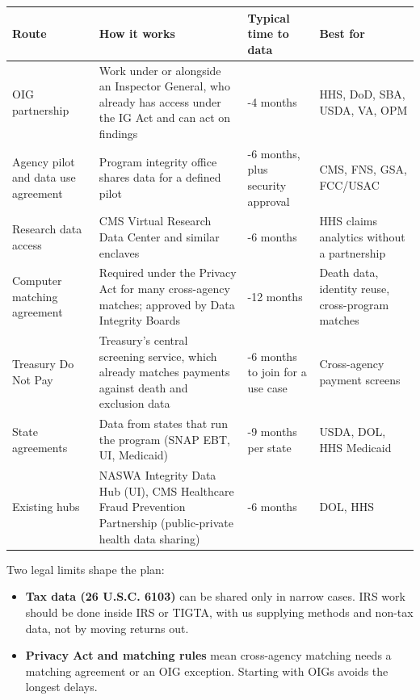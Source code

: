 \documentclass[letterpaper,11pt]{article}
\providecommand{\tightlist}{\setlength{\itemsep}{0pt}\setlength{\parskip}{0pt}}
\begin{document}
\begingroup\small\setlength{\tabcolsep}{4pt}\renewcommand{\arraystretch}{1.25}
\begin{longtable}[l]{@{}>{\raggedright\arraybackslash}p{}>{\raggedright\arraybackslash}p{}>{\raggedright\arraybackslash}p{}>{\raggedright\arraybackslash}p{}@{}}
\rowcolor{coolblack}\leavevmode\color{white}\bfseries Route & \leavevmode\color{white}\bfseries How it works & \leavevmode\color{white}\bfseries Typical time to data & \leavevmode\color{white}\bfseries Best for \\
\endhead
OIG partnership & Work under or alongside an Inspector General, who already has access under the IG Act and can act on findings & 2-4 months & HHS, DoD, SBA, USDA, VA, OPM \\
Agency pilot and data use agreement & Program integrity office shares data for a defined pilot & 3-6 months, plus security approval & CMS, FNS, GSA, FCC/USAC \\
Research data access & CMS Virtual Research Data Center and similar enclaves & 3-6 months & HHS claims analytics without a partnership \\
Computer matching agreement & Required under the Privacy Act for many cross-agency matches; approved by Data Integrity Boards & 6-12 months & Death data, identity reuse, cross-program matches \\
Treasury Do Not Pay & Treasury's central screening service, which already matches payments against death and exclusion data & 3-6 months to join for a use case & Cross-agency payment screens \\
State agreements & Data from states that run the program (SNAP EBT, UI, Medicaid) & 3-9 months per state & USDA, DOL, HHS Medicaid \\
Existing hubs & NASWA Integrity Data Hub (UI), CMS Healthcare Fraud Prevention Partnership (public-private health data sharing) & 2-6 months & DOL, HHS \\
\end{longtable}\endgroup

Two legal limits shape the plan:

\begin{itemize}
\tightlist
\item
  \textbf{Tax data (26 U.S.C. 6103)} can be shared only in narrow cases.
  IRS work should be done inside IRS or TIGTA, with us supplying methods
  and non-tax data, not by moving returns out.
\item
  \textbf{Privacy Act and matching rules} mean cross-agency matching
  needs a matching agreement or an OIG exception. Starting with OIGs
  avoids the longest delays.
\end{itemize}
\end{document}
